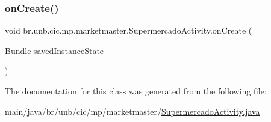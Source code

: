 \subsubsection{\texorpdfstring{on\+Create()}{onCreate()}}
{\footnotesize\ttfamily void br.\+unb.\+cic.\+mp.\+marketmaster.\+Supermercado\+Activity.\+on\+Create (\begin{DoxyParamCaption}\item[{Bundle}]{saved\+Instance\+State }\end{DoxyParamCaption})\hspace{0.3cm}{\ttfamily [protected]}}



The documentation for this class was generated from the following file\+:\begin{DoxyCompactItemize}
\item 
main/java/br/unb/cic/mp/marketmaster/\mbox{\hyperlink{SupermercadoActivity_8java}{Supermercado\+Activity.\+java}}\end{DoxyCompactItemize}
